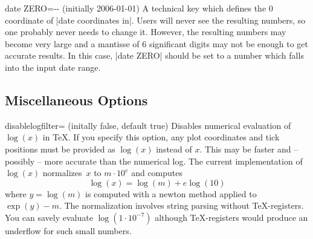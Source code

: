 \begin{pgfplotskey}{date ZERO=-- (initially 2006-01-01)}
	A technical key which defines the $0$ coordinate of |date coordinates in|. Users will never see the resulting numbers, so one probably never needs to change it. However, the resulting numbers may become very large and a mantisse of 6 significant digits may not be enough to get accurate results. In this case, |date ZERO| should be set to a number which falls into the input date range.
\end{pgfplotskey}




\subsection{Miscellaneous Options}

\begin{pgfplotskey}{disablelogfilter= (initally false, default true)}
Disables numerical evaluation of $\log(x)$ in \TeX. If you specify this option, any plot coordinates and tick positions must be provided as $\log(x)$ instead of $x$. This may be faster and -- possibly -- more accurate than the numerical log. The current implementation of $\log(x)$ normalizes~$x$ to $m\cdot 10^e$ and computes
\[ \log(x) = \log(m) + e \log(10) \]
where $y = \log(m)$ is computed with a newton method applied to $\exp(y) - m$. The normalization involves string parsing without \TeX-registers. You can savely evaluate $\log(1\cdot 10^{-7})$ although \TeX-registers would produce an underflow for such small numbers. 
\end{pgfplotskey}

